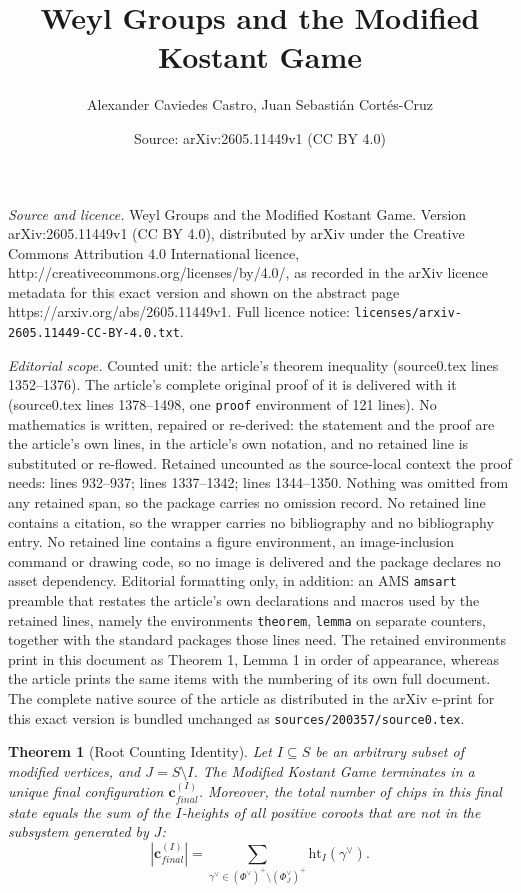 \documentclass[10pt,a4paper]{amsart}
\title{Weyl Groups and the Modified Kostant Game}
\author{Alexander Caviedes Castro, Juan Sebasti\'an Cort\'es-Cruz}
\date{Source: arXiv:2605.11449v1 (CC BY 4.0)}
\newtheorem{theorem}{Theorem}
\begin{document}
\maketitle

\noindent\emph{Source and licence.} Weyl Groups and the Modified Kostant Game. Version arXiv:2605.11449v1 (CC BY 4.0), distributed by arXiv under the Creative Commons Attribution 4.0 International licence, http://creativecommons.org/licenses/by/4.0/, as recorded in the arXiv licence metadata for this exact version and shown on the abstract page https://arxiv.org/abs/2605.11449v1. Full licence notice: \texttt{licenses/arxiv-2605.11449-CC-BY-4.0.txt}.\par\smallskip

\noindent\textit{Editorial scope.} Counted unit: the article's theorem inequality (source0.tex lines 1352--1376). The article's complete original proof of it is delivered with it (source0.tex lines 1378--1498, one \texttt{proof} environment of 121 lines). No mathematics is written, repaired or re-derived: the statement and the proof are the article's own lines, in the article's own notation, and no retained line is substituted or re-flowed.  Retained uncounted as the source-local context the proof needs: lines 932--937; lines 1337--1342; lines 1344--1350.  Nothing was omitted from any retained span, so the package carries no omission record.  No retained line contains a citation, so the wrapper carries no bibliography and no bibliography entry.  No retained line contains a figure environment, an image-inclusion command or drawing code, so no image is delivered and the package declares no asset dependency.  Editorial formatting only, in addition: an AMS \texttt{amsart} preamble that restates the article's own declarations and macros used by the retained lines, namely the environments \texttt{theorem}, \texttt{lemma} on separate counters, together with the standard packages those lines need.  The retained environments print in this document as Theorem 1, Lemma 1 in order of appearance, whereas the article prints the same items with the numbering of its own full document.  The complete native source of the article as distributed in the arXiv e-print for this exact version is bundled unchanged as \texttt{sources/200357/source0.tex}.
\begin{theorem}[Root Counting Identity]\label{thm:root_counting_identity}
	Let $I \subseteq S$ be an arbitrary subset of modified vertices, and $J = S \setminus I$. The Modified Kostant Game terminates in a unique final configuration $\mathbf{c}_{final}^{(I)}$. Moreover, the total number of chips in this final state equals the sum of the $I$-heights of all positive coroots that are not in the subsystem generated by $J$:
	\begin{equation}
		|\mathbf{c}_{final}^{(I)}| = \sum_{\gamma^\vee \in (\Phi^\vee)^+ \setminus (\Phi_J^\vee)^+} \mathrm{ht}_I(\gamma^\vee).
	\end{equation}
\end{theorem}
\end{document}
